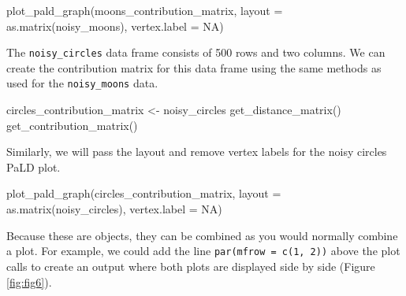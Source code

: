 \begin{Schunk}
\begin{Sinput}
plot_pald_graph(moons_contribution_matrix,
                layout = as.matrix(noisy_moons),
                vertex.label = NA)
\end{Sinput}
\end{Schunk}

The \texttt{noisy\_circles} data frame consists of 500 rows and two
columns. We can create the contribution matrix for this data frame using
the same methods as used for the \texttt{noisy\_moons} data.

\begin{Schunk}
\begin{Sinput}
circles_contribution_matrix <- noisy_circles %
  get_distance_matrix() %
  get_contribution_matrix()
\end{Sinput}
\end{Schunk}

Similarly, we will pass the layout and remove vertex labels for the
noisy circles PaLD plot.

\begin{Schunk}
\begin{Sinput}
plot_pald_graph(circles_contribution_matrix,
                layout = as.matrix(noisy_circles),
                vertex.label = NA)
\end{Sinput}
\end{Schunk}

Because these are  objects, they can be combined as you
would normally combine a plot. For example, we could add the line
\texttt{par(mfrow\ =\ c(1,\ 2))} above the plot calls to create an
output where both plots are displayed side by side (Figure
\ref{fig:fig6}).

